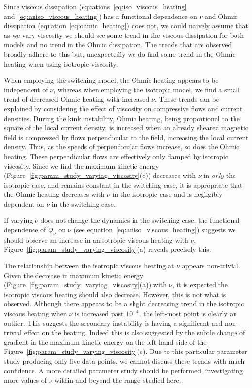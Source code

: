 Since viscous dissipation (equations~\eqref{eq:iso_viscous_heating} and~\eqref{eq:aniso_viscous_heating}) has a functional dependence on $\nu$ and Ohmic dissipation (equation~\eqref{eq:ohmic_heating}) does not, we could naively assume that as we vary viscosity we should see some trend in the viscous dissipation for both models and no trend in the Ohmic dissipation. The trends that are observed broadly adhere to this but, unexpectedly we do find some trend in the Ohmic heating when using isotropic viscosity.

When employing the switching model, the Ohmic heating appears to be independent of $\nu$, whereas when employing the isotropic model, we find a small trend of decreased Ohmic heating with increased $\nu$. These trends can be explained by considering the effect of viscosity on compressive flows and current densities. During the kink instability, Ohmic heating, being proportional to the square of the local current density, is increased when an already sheared magnetic field is compressed by flows perpendicular to the field, increasing the local current density. Thus, as the speeds of perpendicular flows increase, so does the Ohmic heating. These perpendicular flows are effectively only damped by isotropic viscosity. Since we find the maximum kinetic energy (Figure~\ref{fig:param_study_varying_viscosity}(c)) decreases with $\nu$ in \emph{only} the isotropic case, and remains constant in the switching case, it is appropriate that the Ohmic heating decreases with $\nu$ in the isotropic case and is negligibly dependent on $\nu$ in the switching case.

If varying $\nu$ does not change the dynamics in the switching case, the functional dependence of $Q_{\nu}$ on $\nu$ (see equation~\eqref{eq:aniso_viscous_heating}) suggests we should observe an increase in anisotropic viscous heating with $\nu$. Figure~\ref{fig:param_study_varying_viscosity}(a) reveals precisely this.

The relationship between the isotropic viscous heating at $\nu$ appears non-trivial. Given the decrease in maximum kinetic energy (Figure~\ref{fig:param_study_varying_viscosity}(a)) with $\nu$, it is expected the isotropic viscous heating should also decrease. However, this is not what is observed. Although there appears to be a slight decreasing trend in the isotropic viscous heating when $\nu$ is increased past $10^{-4}$, the left-most point is clearly an outlier. This suggests the secondary instability is having a significant and non-trivial effect on the heating. Indeed this is also suggested by the subtle change of gradient in the maximum kinetic energy on the left-hand side of the Figure~\ref{fig:param_study_varying_viscosity}(c). Due to this particular parameter study producing only five data points, we cannot discuss these trends with much confidence. A more detailed parameter study should be performed, investigating more values of $\nu$ within and beyond the range studied here.

